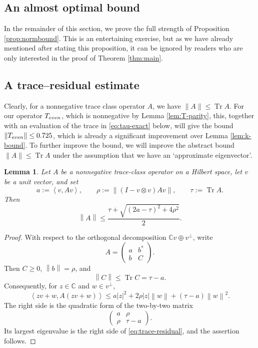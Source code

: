 \documentclass[10pt,a4paper]{amsart}
\newtheorem{lemma}[theorem]{Lemma}
\newcommand{\ip}[2]{\left\langle #1,#2\right\rangle}
\newcommand{\norm}[1]{\left\lVert #1\right\rVert}
\newcommand{\abs}[1]{\left\lvert #1\right\rvert}
\newcommand{\Tr}{\operatorname{Tr}}
\begin{document}

\subsection{An almost optimal bound}

In the remainder of this section, we prove the full strength of Proposition \ref{prop:normbound}. This is an entertaining exercise, but as we have already mentioned after stating this proposition, it can be ignored by readers who are only interested in the proof of Theorem \ref{thm:main}.




\subsection*{A trace--residual estimate}

Clearly, for a nonnegative trace class operator $A$, we have $\|A\|\leq\Tr A$. For our operator $T_{\rm even}$, which is nonnegative by Lemma \ref{lem:T-parity}, this, together with an evaluation of the trace in \eqref{eq:tau-exact} below, will give the bound $\|T_{\rm even}\|\leq 0.725$, which is already a significant improvement over Lemma \ref{lem:k-bound}. To further improve the bound, we will improve the abstract bound $\|A\|\leq\Tr A$ under the assumption that we have an `approximate eigenvector'.

\begin{lemma}\label{lem:trace-residual}
Let $A$ be a nonnegative trace-class operator on a Hilbert space, let
$v$ be a unit vector, and set
\[
a:=\ip{v}{Av},
\qquad
\rho:=\norm{(I-v\otimes v)Av},
\qquad
\tau:=\operatorname{Tr}A.
\]
Then
\begin{equation}\label{eq:trace-residual}
\norm{A}\leq
\frac{\tau+\sqrt{(2a-\tau)^2+4\rho^2}}{2}.
\end{equation}
\end{lemma}

\begin{proof}
With respect to the orthogonal decomposition
$\mathbb C v\oplus v^\perp$, write
\[
A=\begin{pmatrix}a&b^*\\ b&C\end{pmatrix}.
\]
Then $C\geq0$, $\norm b=\rho$, and
\[
\norm C\leq\operatorname{Tr}C=\tau-a.
\]
Consequently, for $z\in\mathbb C$ and $w\in v^\perp$,
\[
\ip{zv+w}{A(zv+w)}
\leq a\abs z^2+2\rho\abs z\norm w+(\tau-a)\norm w^2.
\]
The right side is the quadratic form of the two-by-two matrix
\[
\begin{pmatrix}a&\rho\\ \rho&\tau-a\end{pmatrix}.
\]
Its largest eigenvalue is the right side of
\eqref{eq:trace-residual}, and the assertion follows.
\end{proof}
\end{document}
